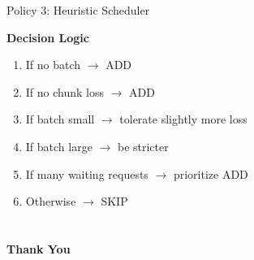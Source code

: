 \documentclass[Serif, 10pt, brown]{beamer}
\theoremstyle{example}
\theoremstyle{plain}
\begin{document}
\begin{frame}{Policy 3: Heuristic Scheduler}

\textbf{Decision Logic}

\begin{enumerate}
    \item If no batch $\rightarrow$ ADD
    \item If no chunk loss $\rightarrow$ ADD
    \item If batch small $\rightarrow$ tolerate slightly more loss
    \item If batch large $\rightarrow$ be stricter
    \item If many waiting requests $\rightarrow$ prioritize ADD
    \item Otherwise $\rightarrow$ SKIP
\end{enumerate}
\end{frame}


\section{}
\begin{frame}
    \Huge{\centerline{\bf Thank You}}
\end{frame}
\end{document}
